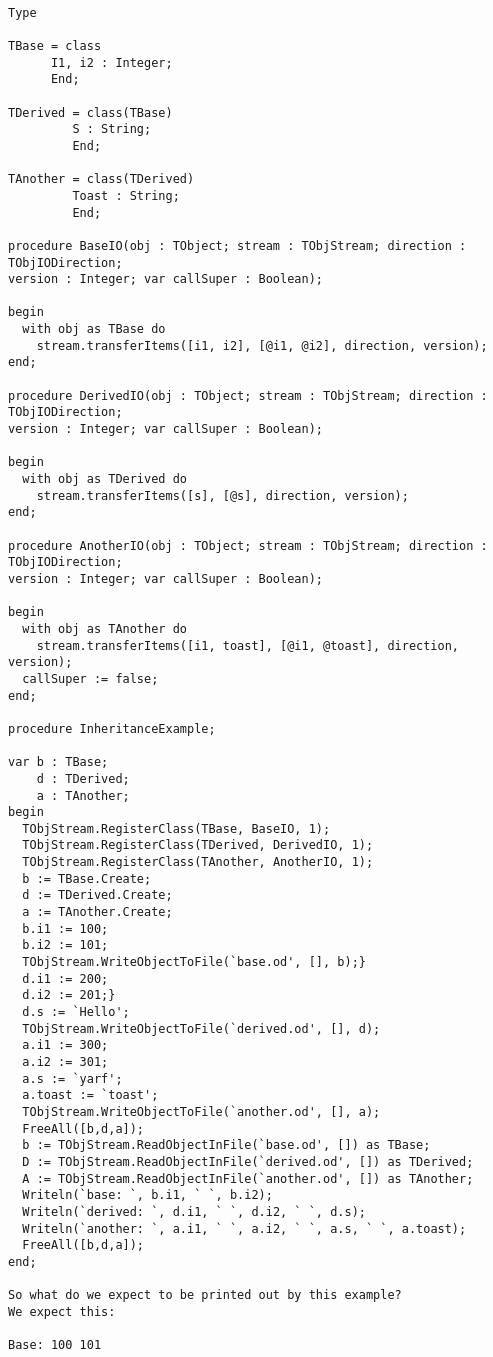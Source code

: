 \documentclass{report}
\begin{document}
\begin{lstlisting}

Type

TBase = class
	  I1, i2 : Integer;
	  End;

TDerived = class(TBase)
	     S : String;
	     End;

TAnother = class(TDerived)
	     Toast : String;
 	     End;

procedure BaseIO(obj : TObject; stream : TObjStream; direction : TObjIODirection;
version : Integer; var callSuper : Boolean);

begin
  with obj as TBase do
    stream.transferItems([i1, i2], [@i1, @i2], direction, version);
end;

procedure DerivedIO(obj : TObject; stream : TObjStream; direction : TObjIODirection;
version : Integer; var callSuper : Boolean);

begin
  with obj as TDerived do
    stream.transferItems([s], [@s], direction, version);
end;

procedure AnotherIO(obj : TObject; stream : TObjStream; direction : TObjIODirection;
version : Integer; var callSuper : Boolean);

begin
  with obj as TAnother do
    stream.transferItems([i1, toast], [@i1, @toast], direction, version);
  callSuper := false;
end;

procedure InheritanceExample;

var b : TBase;
    d : TDerived;
    a : TAnother;
begin
  TObjStream.RegisterClass(TBase, BaseIO, 1);
  TObjStream.RegisterClass(TDerived, DerivedIO, 1);
  TObjStream.RegisterClass(TAnother, AnotherIO, 1);
  b := TBase.Create;
  d := TDerived.Create;
  a := TAnother.Create;
  b.i1 := 100;
  b.i2 := 101;
  TObjStream.WriteObjectToFile(`base.od', [], b);}
  d.i1 := 200;
  d.i2 := 201;}
  d.s := `Hello';
  TObjStream.WriteObjectToFile(`derived.od', [], d);
  a.i1 := 300;
  a.i2 := 301;
  a.s := `yarf';
  a.toast := `toast';
  TObjStream.WriteObjectToFile(`another.od', [], a);
  FreeAll([b,d,a]);
  b := TObjStream.ReadObjectInFile(`base.od', []) as TBase;
  D := TObjStream.ReadObjectInFile(`derived.od', []) as TDerived;
  A := TObjStream.ReadObjectInFile(`another.od', []) as TAnother;
  Writeln(`base: `, b.i1, ` `, b.i2);
  Writeln(`derived: `, d.i1, ` `, d.i2, ` `, d.s);
  Writeln(`another: `, a.i1, ` `, a.i2, ` `, a.s, ` `, a.toast);
  FreeAll([b,d,a]);
end;

So what do we expect to be printed out by this example? 
We expect this:

Base: 100 101


\end{lstlisting}
\end{document}
